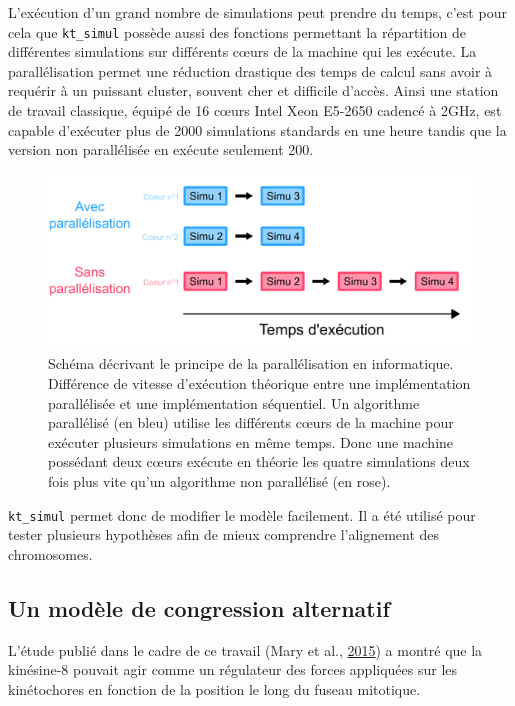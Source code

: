 \documentclass[12pt,a4paper,twoside,openright]{book}
\begin{document}
L'exécution d'un grand nombre de simulations peut prendre du temps,
c'est pour cela que \texttt{kt\_simul} possède aussi des fonctions
permettant la répartition de différentes simulations sur différents
cœurs de la machine qui les exécute. La parallélisation permet une
réduction drastique des temps de calcul sans avoir à requérir à un
puissant cluster, souvent cher et difficile d'accès. Ainsi une station
de travail classique, équipé de 16 cœurs Intel Xeon E5-2650 cadencé à
2GHz, est capable d'exécuter plus de 2000 simulations standards en une
heure tandis que la version non parallélisée en exécute seulement 200.

\begin{figure}[htbp]
\centering
\includegraphics{figures/results/modelling/parallel.png}
\caption[Schéma décrivant le principe de la parallélisation en informatique]{\label{fig:parallel}Schéma
décrivant le principe de la parallélisation en informatique. Différence
de vitesse d'exécution théorique entre une implémentation parallélisée
et une implémentation séquentiel. Un algorithme parallélisé (en bleu)
utilise les différents cœurs de la machine pour exécuter plusieurs
simulations en même temps. Donc une machine possédant deux cœurs exécute
en théorie les quatre simulations deux fois plus vite qu'un algorithme
non parallélisé (en rose).}
\end{figure}

\texttt{kt\_simul} permet donc de modifier le modèle facilement. Il a
été utilisé pour tester plusieurs hypothèses afin de mieux comprendre
l'alignement des chromosomes.

\subsection{Un modèle de congression
alternatif}\label{un-moduxe8le-de-congression-alternatif}

L'étude publié dans le cadre de ce travail (Mary et al.,
\hyperref[ref-Mary2015]{2015}) a montré que la kinésine-8 pouvait agir
comme un régulateur des forces appliquées sur les kinétochores en
fonction de la position le long du fuseau mitotique.
\end{document}
